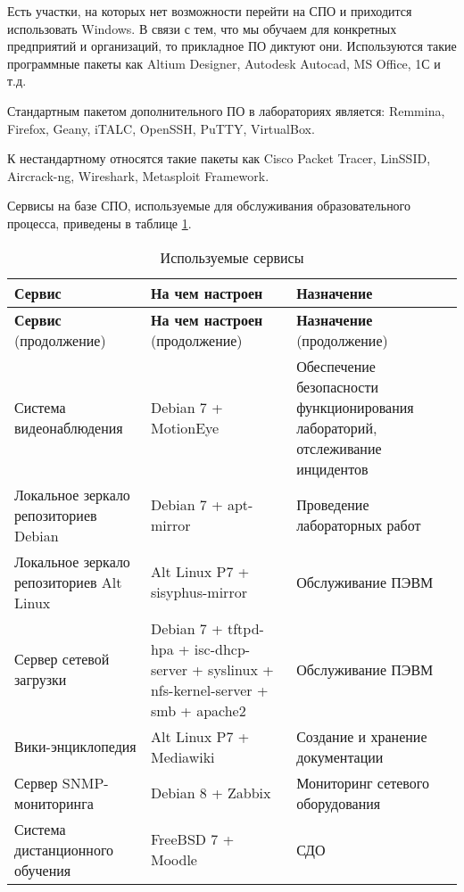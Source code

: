 \documentclass[10pt, a5paper]{article}
\begin{document}
Есть участки, на которых нет возможности перейти на СПО и приходится использовать Windows. В связи с тем, что мы обучаем для конкретных предприятий и организаций, то прикладное ПО диктуют они. Используются такие программные пакеты как Altium Designer, Autodesk Autocad, MS Office, 1С и т.д.

Стандартным пакетом дополнительного ПО в лабораториях является: Remmina, Firefox, Geany, iTALC, OpenSSH, PuTTY, \linebreak VirtualBox.

К нестандартному относятся такие пакеты как Cisco Packet Tracer, LinSSID, Aircrack-ng, Wireshark, Metasploit Framework.

Сервисы на базе СПО, используемые для обслуживания образовательного процесса, приведены в таблице \ref{Uymin2}.

\begin{longtable}[h!]{|p{3cm}|p{3cm}|p{3cm}|}
\caption{Используемые сервисы} \label{Uymin2} \\
\hline

\textbf{Сервис} & \textbf{На чем настроен} & \textbf{Назначение} \\
\hline
\endfirsthead %

\hline
\textbf{Сервис} (продолжение) & \textbf{На чем настроен} (продолжение) & \textbf{Назначение} (продолжение) \\
\hline
\endhead %

    Система видеонаблюдения &  Debian 7 + MotionEye & Обеспечение безопасности функционирования лабораторий, отслеживание инцидентов \\
\hline
    Локальное зеркало репозиториев Debian & Debian 7 + apt-mirror & Проведение лабораторных работ \\
\hline
    Локальное зеркало репозиториев Alt Linux & Alt Linux P7 + sisyphus-mirror & Обслуживание ПЭВМ \\
\hline
    Сервер сетевой загрузки & Debian 7 + tftpd-hpa + isc-dhcp-server + syslinux + nfs-kernel-server + smb + apache2 & Обслуживание ПЭВМ \\
\hline
    Вики-энциклопедия & Alt Linux P7 + Mediawiki & Создание и хранение документации \\
\hline
    Сервер SNMP-мониторинга & Debian 8 + Zabbix & Мониторинг сетевого оборудования \\
\hline
    Система дистанционного обучения & FreeBSD 7 + Moodle & СДО \\
\hline

\end{longtable}
\end{document}
